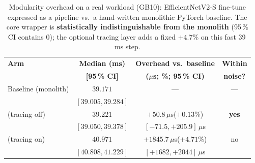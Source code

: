 \begin{table}[t]
  \centering
  \caption{Modularity overhead on a real workload (GB10): EfficientNetV2-S fine-tune
  expressed as a \sysname{} pipeline vs.\ a hand-written monolithic PyTorch baseline.
  The core wrapper is \textbf{statistically indistinguishable from the monolith}
  (95\,\% CI contains 0); the optional tracing layer adds a fixed $+4.7\%$ on this
  fast 39\,ms step.}
  \label{tab:modularity}
  \small
  \begin{tabular}{@{}lccc@{}}
    \toprule
    \textbf{Arm} & \textbf{Median (ms)} & \textbf{Overhead vs.\ baseline} & \textbf{Within} \\
                 & \textbf{[95\,\% CI]}  & \textbf{($\mu$s; \%; 95\,\% CI)}  & \textbf{noise?} \\
    \midrule
    Baseline (monolith)      & $39.171$          & ---                                & --- \\
                             & {\footnotesize$[39.005, 39.284]$} &                    &     \\
    \addlinespace
    \sysname{} (tracing off) & $39.221$          & $+50.8\,\mu$s\;\;($+0.13\%$)        & \textbf{yes} \\
                             & {\footnotesize$[39.050, 39.378]$} & {\footnotesize$[-71.5, +205.9]\,\mu$s} &  \\
    \addlinespace
    \sysname{} (tracing on)  & $40.971$          & $+1845.7\,\mu$s\;($+4.71\%$)        & no \\
                             & {\footnotesize$[40.808, 41.229]$} & {\footnotesize$[+1682, +2044]\,\mu$s} &  \\
    \bottomrule
  \end{tabular}
\end{table}
